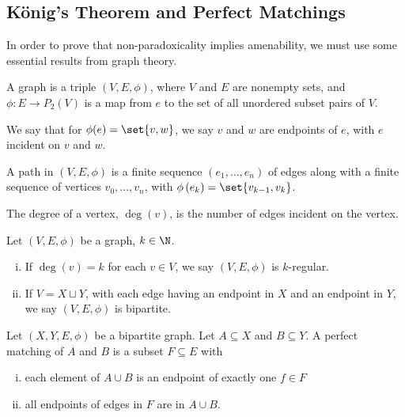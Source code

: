 \documentclass[12pt]{mypackage}
\begin{document}
\subsection{König's Theorem and Perfect Matchings}%
In order to prove that non-paradoxicality implies amenability, we must use some essential results from graph theory.
\begin{definition}
  A graph is a triple $\left(V,E,\phi\right)$, where $V$ and $E$ are nonempty sets, and $\phi: E\rightarrow P_{2}(V)$ is a map from $e$ to the set of all unordered subset pairs of $V$.\newline

  We say that for $\phi(e) = \set{v,w}$, we say $v$ and $w$ are endpoints of $e$, with $e$ incident on $v$ and $w$.\newline

  A path in $(V,E,\phi)$ is a finite sequence $\left(e_1,\dots,e_n\right)$ of edges along with a finite sequence of vertices $v_0,\dots,v_n$, with $\phi\left(e_k\right) = \set{v_{k-1},v_k}$.\newline

  The degree of a vertex, $\deg(v)$, is the number of edges incident on the vertex.
\end{definition}
\begin{definition}
  Let $(V,E,\phi)$ be a graph, $k\in \N$.
  \begin{enumerate}[(i)]
    \item If $\deg(v) = k$ for each $v\in V$, we say $(V,E,\phi)$ is $k$-regular.
    \item If $V = X\sqcup Y$, with each edge having an endpoint in $X$ and an endpoint in $Y$, we say $(V,E,\phi)$ is bipartite.
  \end{enumerate}
\end{definition}
\begin{definition}
Let $(X,Y,E,\phi)$ be a bipartite graph. Let $A\subseteq X$ and $B\subseteq Y$. A perfect matching of $A$ and $B$ is a subset $F\subseteq E$ with
\begin{enumerate}[(i)]
  \item each element of $A\cup B$ is an endpoint of exactly one $f\in F$
  \item all endpoints of edges in $F$ are in $A\cup B$.
\end{enumerate}
\end{definition}
\end{document}
